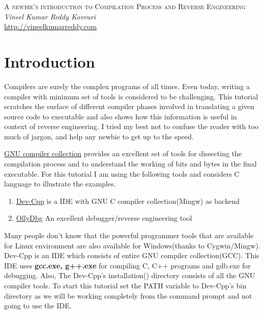 \documentclass{article}
\begin{document}
\begin{titlepage}
   \begin{center}
      \Large\textsc{A newbie's introduction to Compilation Process and Reverse Engineering}\\
      \vspace{5mm}
      \Large\textit{Vineel Kumar Reddy Kovvuri}\\
      \url{http://vineelkumarreddy.com}\\
   \end{center}
\end{titlepage}

\tableofcontents

\newpage
\section{Introduction}
Compilers are surely the complex programs of all times. Even today, writing a compiler with minimum set of tools is considered to be challenging. This tutorial scratches the surface of different compiler phases involved in translating a given source code to executable and also shows how this information is useful in context of reverse engineering. I tried my best not to confuse the reader with too much of jargon, and help any newbie to get up to the speed.

\href{''https://en.wikipedia.org/wiki/GNU\_Compiler\_Collection''}{GNU compiler collection} provides an excellent set of tools for dissecting the compilation process and to understand the working of bits and bytes in the final executable. For this tutorial I am using the following tools and considers C language to illustrate the examples.

\begin{enumerate}[noitemsep]
    \item \href{''http://orwelldevcpp.blogspot.com/''}{Dev-Cpp} is a IDE with GNU C compiler collection(Mingw) as backend
    \item \href{''http://www.ollydbg.de/''}{OllyDbg} An excellent debugger/reverse engineering tool
\end{enumerate}

Many people don't know that the powerful programmer tools that are available for Linux environment are also available for Windows(thanks to Cygwin/Mingw). Dev-Cpp is an IDE which consists of entire GNU compiler collection(GCC). This IDE uses \textbf{gcc.exe, g++.exe} for compiling C, C++ programs and gdb.exe for debugging. Also, The Dev-Cpp's installation() directory consists of all the GNU compiler tools. To start this tutorial set the PATH variable to Dev-Cpp's bin directory as we will be working completely from the command prompt and not going to use the IDE.
\end{document}
